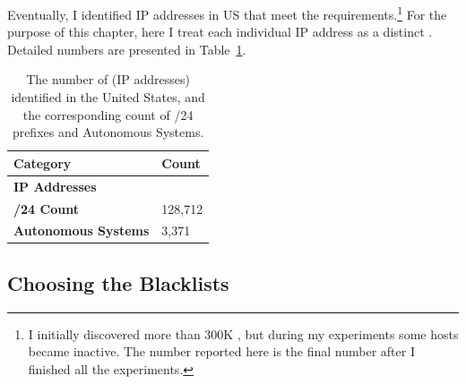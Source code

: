 Eventually, I identified {} IP addresses in US that meet the
requirements.\footnote{I initially discovered more than 300K {}, 
but during my experiments some hosts became inactive. The number reported 
here is the final number after I finished all the experiments.} For the 
purpose of this chapter, here I treat each individual IP address as a 
distinct {}. Detailed numbers are presented in
Table~\ref{tab:target-hosts}.

\begin{table}[t]
\centering
\caption{The number of {} (IP addresses) identified in the United States, and the
corresponding count of /24 prefixes and Autonomous Systems.}
\begin{tabular}{l >{\hfill}p{4.5cm}}
 \toprule
 Category                    &  Count    \\
 \midrule
 \textbf{IP Addresses}       &    \\
 \textbf{/24 Count}          &  128,712  \\
 \textbf{Autonomous Systems} &  3,371    \\
 \bottomrule
\end{tabular}
\label{tab:target-hosts}
\end{table}

\subsection{Choosing the Blacklists}
\label{sec:methblkl}

